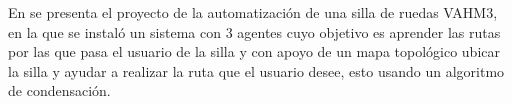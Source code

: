 En \cite{Grasse2010} se presenta el proyecto de la automatizaci\'on de una 
 silla de ruedas VAHM3, en la que se instal\'o un sistema con 3 agentes cuyo
 objetivo es aprender las rutas por las que pasa el usuario de la silla y 
 con apoyo de un mapa topol\'ogico ubicar la silla y ayudar a realizar la ruta
 que el usuario desee, esto usando un algoritmo de condensaci\'on.